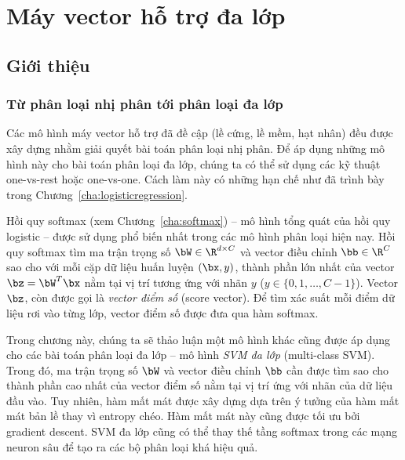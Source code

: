 \chapter{Máy vector hỗ trợ đa lớp}
\label{cha:multisvm} 
\section{Giới thiệu }
 
 
\subsection{Từ phân loại nhị phân tới phân loại đa lớp}
 
Các mô hình máy vector hỗ trợ đã đề cập (lề cứng, lề mềm, hạt nhân) đều được xây
dựng nhằm giải quyết bài toán phân loại nhị phân. Để áp dụng những mô hình này
cho bài toán phân loại đa lớp, chúng ta có thể sử dụng các kỹ thuật one-vs-rest
hoặc one-vs-one. Cách làm này có những hạn chế như đã trình bày trong
Chương~\ref{cha:logisticregression}.

Hồi quy softmax (xem Chương~\ref{cha:softmax}) -- mô hình 
tổng quát của hồi quy logistic -- được sử dụng phổ biến nhất trong
các mô hình phân loại hiện nay. Hồi quy softmax tìm ma trận trọng số $\bW \in \R^{d \times C}$ và vector điều chỉnh $\bb \in \R^C$ sao cho với mỗi cặp dữ liệu huấn luyện $(\bx, y)$, thành phần lớn nhất của vector $\bz = \bW^T\bx$ nằm tại vị trí tương ứng với nhãn $y$ ($y \in \{0, 1, \dots, C-1\}$). Vector $\bz$, còn được gọi là \textit{vector điểm số} (score vector). Để tìm xác suất mỗi điểm dữ liệu rơi vào từng lớp, vector điểm số được đưa qua hàm softmax. 


Trong chương này, chúng ta sẽ thảo luận một mô hình khác cũng được áp dụng cho
các bài toán phân loại đa lớp -- mô hình \textit{SVM đa lớp} (multi-class SVM).
Trong đó, ma trận trọng số $\bW$ và vector điều chỉnh $\bb$ cần được tìm sao cho
thành phần cao nhất của vector điểm số nằm tại vị trí ứng với nhãn của dữ liệu
đầu vào. Tuy nhiên, hàm mất mát được xây dựng dựa trên ý tưởng của hàm mất mát
bản lề thay vì entropy chéo. Hàm mất mát này cũng được tối ưu bởi gradient
descent. SVM đa lớp cũng có thể thay thế tầng softmax trong các mạng neuron sâu
để tạo ra các bộ phân loại khá hiệu quả.





